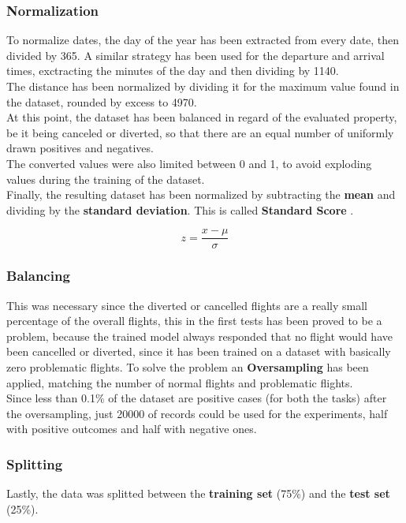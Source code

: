 \documentclass[
	letterpaper, %
	10pt, %
]{class}
\begin{document}
\subsubsection{Normalization}

To normalize dates, the day of the year has been extracted from every date, then divided by 365. A similar strategy has been used for the departure and arrival times, exctracting the minutes of the day and then dividing by 1140.\\

The distance has been normalized by dividing it for the maximum value found in the dataset, rounded by excess to 4970.\\

At this point, the dataset has been balanced in regard of the evaluated property, be it being canceled or diverted, so that there are an equal number of uniformly drawn positives and negatives.\\

The converted values were also limited between 0 and 1, to avoid exploding values during the training of the dataset.\\

Finally, the resulting dataset has been normalized by subtracting the \textbf{mean} and dividing by the \textbf{standard deviation}. This is called \textbf{Standard Score} \cite{normalization}.

$$ z = \frac{x - \mu}{\sigma} $$

\subsubsection{Balancing}

This was necessary since the diverted or cancelled flights are a really small percentage of the overall flights,
this in the first tests has been proved to be a problem, because the trained model always responded that no flight would have been cancelled or diverted, since it has been trained on a dataset with basically zero problematic flights.
To solve the problem an \textbf{Oversampling} has been applied, matching the number of normal flights and problematic flights.\\
Since less than 0.1\% of the dataset are positive cases (for both the tasks) after the oversampling, just 20000 of records could be used for the experiments, half with positive outcomes and half with negative ones.

\subsubsection{Splitting}
Lastly, the data was splitted between the \textbf{training set} (75\%) and the \textbf{test set} (25\%).\\
\end{document}
